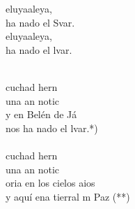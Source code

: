 \begin{cancion}%
	\begin{chorus}%
	eluyaaleya,\\
	ha nado el Svar.\\
	eluyaaleya,\\
	ha nado el lvar.\\
	\end{chorus}%
	\jump\\
	cuchad hern\\
	una an notic \\
	y en Belén de Já\\
	nos ha nado el lvar.*)\\
\jump\\
	cuchad hern\\
	una an notic  \\
	oria en los cielos aios\\
	y aquí ena tierral m Paz (**)\\
\end{cancion}%
